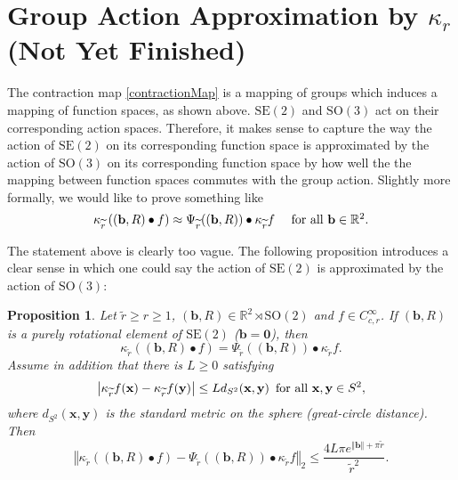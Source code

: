 \documentclass[a4paper,11pt]{scrartcl}
\newcounter{dummy}
\numberwithin{dummy}{section}
\theoremstyle{plain}
\newtheorem{proposition}[dummy]{Proposition}
\theoremstyle{plain}
\theoremstyle{plain}
\theoremstyle{plain}
\theoremstyle{nonumberplain}
\newcommand{\F}[1][R]{\mathbb{#1}} %
\newcommand{\Ltwonorm}[1]{\left\Vert #1 \right\Vert} %
\newcommand{\SE}{\mathrm{SE}}
\newcommand{\SO}{\mathrm{SO}}
\begin{document}
	\section{Group Action Approximation by $ \kappa_{r} $ (Not Yet Finished)}
	The contraction map \eqref{contractionMap} is a mapping of groups which induces a mapping of function spaces, as shown above. $ \SE(2) $ and $ \SO(3) $  act on their corresponding action spaces. Therefore, it makes sense to capture the way the action of $ \SE(2) $ on its corresponding function space is approximated by the action of $ \SO(3) $ on its corresponding function space by how well the the mapping between function spaces commutes with the group action. Slightly more formally, we would like to prove something like
	\begin{equation*}
	\kappa_{\widetilde{r}} \left( (\mathbf{b}, R) \bullet f \right) \approx \Psi_{\widetilde{r}} ((\mathbf{b}, R)) \bullet \kappa_{\widetilde{r}} f 
	\quad\mbox{ for all $ \mathbf{b} \in \F^{2} $}.
	\end{equation*}
	
	The statement above is clearly too vague. The following proposition introduces a clear sense in which one could say the action of $ \SE(2) $ is approximated by the action of $ \SO(3) $:
	\begin{proposition}
		\label{GroupActionApprox}
		Let $ \widetilde{r} \ge r \ge 1 $, $ (\mathbf{b}, R) \in \F^{2} \rtimes \SO(2) $ and $ f \in C_{c, r}^{\infty} $.
		If $ (\mathbf{b}, R) $ is a purely rotational element of $ \SE(2) $ ($ \mathbf{b} = \mathbf{0} $), then 
		\begin{equation}
		\label{CummResult2}
		\kappa_{\widetilde{r}} \left( (\mathbf{b}, R) \bullet f \right)
		= \Psi_{\widetilde{r}} ((\mathbf{b}, R)) \bullet \kappa_{\widetilde{r}} f.
		\end{equation}
		Assume in addition that there is $ L \ge 0 $ satisfying
		\begin{equation}
		\label{LipschitzOfProj}
		\left| \kappa_{\widetilde{r}} f(\mathbf{x}) - \kappa_{\widetilde{r}} f(\mathbf{y}) \right| \le L d_{S^{2}} ( \mathbf{x}, \mathbf{y} )
		\enskip \mbox{for all } \mathbf{x}, \mathbf{y} \in S^{2},
		\end{equation}
		where $ d_{S^{2}} (\mathbf{x}, \mathbf{y}) $ is the standard metric on the sphere (great-circle distance). Then 
		\begin{equation}
			\label{CummResult1}
			\Ltwonorm{\kappa_{\widetilde{r}} \left( (\mathbf{b}, R) \bullet f \right) - \Psi_{\widetilde{r}} ((\mathbf{b}, R)) \bullet \kappa_{\widetilde{r}} f }_{2}
			\le \frac{4 L \pi e^{\Ltwonorm{\mathbf{b}} + \pi \widetilde{r}}}{\widetilde{r}^{2}}.
		\end{equation}
	\end{proposition}
	
\end{document}
